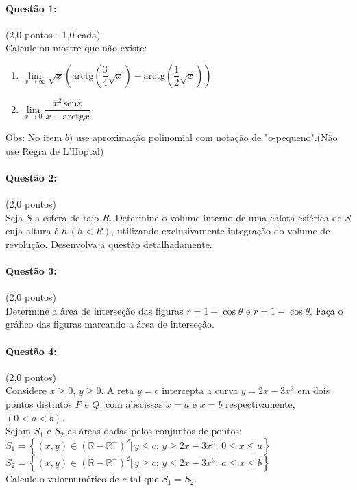 \documentclass[12pt,a4paper]{article}
\newcommand{\R}{\mathbb{R}}
\newcommand{\sen}{\mathrm{sen}}
\begin{document}
\paragraph{Questão 1:}(2,0 pontos - 1,0 cada)\\
Calcule ou mostre que não existe:

\begin{enumerate}[label=(\alph*)]
\item $\lim\limits_{x\to \infty}\sqrt{x}\left(\mathrm{arctg}\left( \dfrac{3}{4}\sqrt{x} \right )-\mathrm{arctg}\left(\dfrac{1}{2}\sqrt{x} \right )  \right )$
\item $\lim\limits_{x\to 0}\dfrac{x^2\,\sen x}{x-\mathrm{arctg}x}$
\end{enumerate}

Obs: No item $b)$ use aproximação polinomial com notação de "o-pequeno".(Não use Regra de L'Hoptal)
\paragraph{Questão 2:}(2,0 pontos)\\
Seja $S$ a esfera de raio $R$. Determine o volume interno de uma calota esférica de $S$ cuja altura é $h\,(h<R)$, utilizando exclusivamente integração do volume de revolução. Desenvolva a questão detalhadamente.

\paragraph{Questão 3:}(2,0 pontos)\\
Determine a área de interseção das figuras $r=1+\cos\theta$ e $r=1-\cos\theta$. Faça o gráfico das figuras marcando a área de interseção.

\paragraph{Questão 4:}(2,0 pontos)\\
Considere $x \geq 0$, $y \geq 0$. A reta $y=c$ intercepta a curva $y=2x-3x^3$ em dois pontos distintos $P$ e $Q$, com abscissas $x=a$ e $x=b$ respectivamente,\,$(0<a<b)$.\\
Sejam $S_1$ e $S_2$ as áreas dadas pelos conjuntos de pontos:\\
$S_1=\left \{ (x,y) \in (\R-\R^-)^2 \vert\, y\leq c;\,y\geq 2x-3x^3;\,0\leq x \leq a\right \}$\\
$S_2=\left \{ (x,y) \in (\R-\R^-)^2 \vert\, y\geq c;\,y\leq 2x-3x^3;\,a\leq x \leq b\right \}$\\
Calcule o valornumérico de $c$ tal que $S_1=S_2$.
\end{document}
